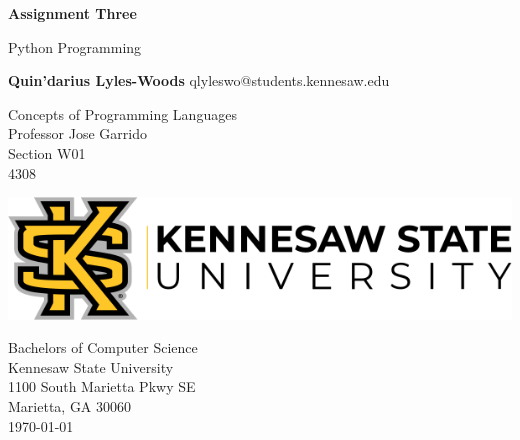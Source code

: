 \begin{titlepage}
\begin{center}
	\vspace*{1cm}

	\Huge
	\textbf{Assignment Three}

	\vspace{0.5cm}
	\LARGE
		Python Programming	

	\vspace{1.5cm}

	\textbf{Quin'darius Lyles-Woods}
	\Large
	qlyleswo@students.kennesaw.edu

	\vfill
	\LARGE
	Concepts of Programming Languages	\\
	Professor Jose Garrido			\\
	Section W01 				\\
	4308
	\vspace{0.8cm}

	\includegraphics[width=\textwidth]{kennesawlogo}

	\vspace{0.8cm}

	\Large
	Bachelors of Computer Science\\
	Kennesaw State University\\
	1100 South Marietta Pkwy SE\\
	Marietta, GA 30060\\
	\today	

	\vspace{1cm}

\end{center}
\end{titlepage}
